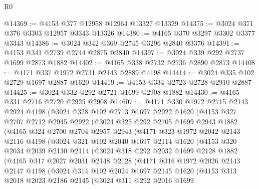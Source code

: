 \begin{lexlean}{R0}
\begin{coremodule}
@14369 := @4153 @377 @12958 @12964 @13327 @13329
@14375 := @3024 @371 @376 @3303 @12957 @3343 @13326
@14380 := @4165 @370 @3297 @3302 @3377 @3343
@14386 := @3024 @342 @369 @2745 @3296 @2840 @3376
@14391 := @4153 @341 @2739 @2744 @2875 @2840
@14397 := @3024 @339 @292 @2737 @1699 @2873 @1882
@14402 := @4165 @338 @2732 @2736 @2890 @2873
@14408 := @4171 @337 @1972 @2731 @2143 @2889 @4198
@14414 := @3024 @335 @102 @2729 @1697 @2887 @1620
@14419 := @4153 @334 @2723 @2728 @2910 @2887
@14425 := @3024 @332 @292 @2721 @1699 @2908 @1882
@14430 := @4165 @331 @2716 @2720 @2925 @2908
@14607 := @4171
    @330
    @1972
    @2715
    @2143
    @2924
    @4198
    (@3024
      @328
      @102
      @2713
      @1697
      @2922
      @1620
      (@4153
        @327
        @2707
        @2712
        @2945
        @2922
        (@3024
          @325
          @292
          @2705
          @1699
          @2943
          @1882
          (@4165
            @324
            @2700
            @2704
            @2957
            @2943
            (@4171
              @323
              @1972
              @2042
              @2143
              @2116
              @4198
              (@3024
                @321
                @102
                @2040
                @1697
                @2114
                @1620
                (@4153
                  @320
                  @2034
                  @2039
                  @2130
                  @2114
                  (@3024
                    @318
                    @292
                    @2032
                    @1699
                    @2128
                    @1882
                    (@4165
                      @317
                      @2027
                      @2031
                      @2148
                      @2128
                      (@4171
                        @316
                        @1972
                        @2026
                        @2143
                        @2147
                        @4198
                        (@3024
                          @314
                          @102
                          @2024
                          @1697
                          @2145
                          @1620
                          (@4153
                            @313
                            @2018
                            @2023
                            @2186
                            @2145
                            (@3024
                              @311
                              @292
                              @2016
                              @1699

\end{coremodule}
\end{lexlean}
